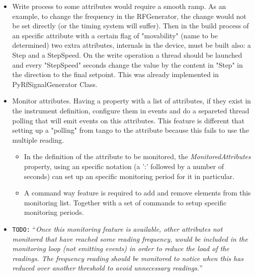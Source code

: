\documentclass[a4paper,10pt]{article}
\newcommand{\todo}[1]{\texttt{\color{red}TODO:} ``\emph{#1}''}
\begin{document}
\begin{itemize}
    \item Write process to some attributes would require a smooth ramp. As an example, to change the frequency in the RFGenerator, the change would not be set directly (or the timing system will suffer). Then in the build process of an specific attribute with a certain flag of "movability" (name to be determined) two extra attributes, internals in the device, must be built also: a Step and a StepSpeed. On the write operation a thread should be launched and every "StepSpeed" seconds change the value by the content in "Step" in the direction to the final setpoint. This was already implemented in PyRfSignalGenerator Class.
    \item Monitor attributes. Having a property with a list of attributes, if they exist in the instrument definition, configure them in events and do a separeted thread polling that will emit events on this attributes. This feature is different that setting up a "polling" from tango to the attribute because this fails to use the multiple reading.
    \begin{itemize}
        \item In the definition of the attribute to be monitored, the \emph{MonitoredAttributes} property, using an specific notation (a ':' followed by a number of seconds) can set up an specific monitoring period for it in particular.
        \item A command way feature is required to add and remove elements from this monitoring list. Together with a set of commands to setup specific monitoring periods.
    \end{itemize}
    \item \todo{Once this monitoring feature is available, other attributes not monitored that have reached some reading frequency, would be included in the monitoring loop (not emitting events) in order to reduce the load of the readings. The frequency reading should be monitored to notice when this has reduced over another threshold to avoid unnecessary readings.}
\end{itemize}
\end{document}
